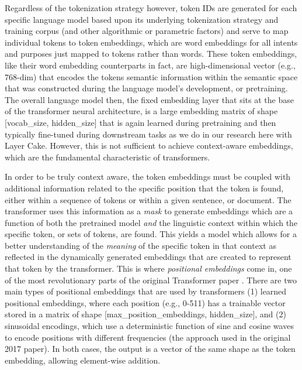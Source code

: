 \documentclass[final]{clv2025}
\begin{document}
Regardless of the tokenization strategy however, token IDs are generated for each specific language model based upon its underlying tokenization strategy and training corpus (and other algorithmic or parametric factors) and serve to map individual tokens to token embeddings, which are word embeddings for all intents and purposes just mapped to tokens rather than words. These token embeddings, like their word embedding counterparts in fact, are high-dimensional vector (e.g., 768-dim) that encodes the tokens semantic information within the semantic space that was constructed during the language model's development, or pretraining. The overall language model then, the fixed embedding layer that sits at the base of the transformer neural architecture, is a large embedding matrix of shape [vocab\_size, hidden\_size] that is again learned during pretraining and then typically fine-tuned during downstream tasks as we do in our research here with Layer Cake. However, this is not sufficient to achieve context-aware embeddings, which are the fundamental characteristic of transformers. 

In order to be truly context aware, the token embeddings must be coupled with additional information related to the specific position that the token is found, either within a sequence of tokens or within a given sentence, or document. The transformer uses this information as a \textit{mask} to generate embeddings which are a function of both the pretrained model \textit{and} the linguistic context within which the specific token, or sets of tokens, are found. This yields a model which allows for a better understanding of the \textit{meaning} of the specific token in that context as reflected in the dynamically generated embeddings that are created to represent that token by the transformer. This is where \textit{positional embeddings} come in, one of the most revolutionary parts of the original Transformer paper \cite{vaswani}. There are two main types of positional embeddings that are used by transformers (1) learned positional embeddings, where each position (e.g., 0-511) has a trainable vector stored in a matrix of shape [max\_position\_embeddings, hidden\_size], and (2) sinusoidal encodings, which use a deterministic function of sine and cosine waves to encode positions with different frequencies (the approach used in the original 2017 paper). In both cases, the output is a vector of the same shape as the token embedding, allowing element-wise addition.
\end{document}
